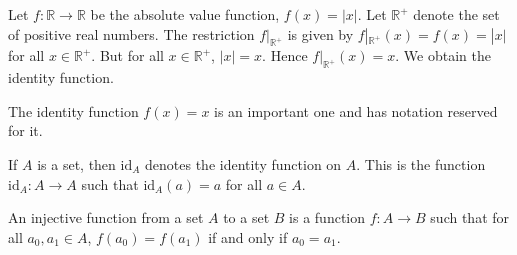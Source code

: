             \begin{example}
                Let $f:\mathbb{R}\rightarrow\mathbb{R}$ be the absolute value
                function, $f(x)=|x|$. Let $\mathbb{R}^{+}$ denote the set of
                positive real numbers. The restriction
                $f|_{\mathbb{R}^{+}}$ is given by
                $f|_{\mathbb{R}^{+}}(x)=f(x)=|x|$ for all $x\in\mathbb{R}^{+}$.
                But for all $x\in\mathbb{R}^{+}$, $|x|=x$. Hence
                $f|_{\mathbb{R}^{+}}(x)=x$. We obtain the identity function.
            \end{example}
            The identity function $f(x)=x$ is an important one and has notation
            reserved for it.
            \begin{notation}
                If $A$ is a set, then $\textrm{id}_{A}$ denotes the identity
                function on $A$. This is the function
                $\textrm{id}_{A}:A\rightarrow{A}$ such that
                $\textrm{id}_{A}(a)=a$ for all $a\in{A}$.
            \end{notation}
            \begin{definition}
                An injective function from a set $A$ to a set $B$ is a function
                $f:A\rightarrow{B}$ such that for all $a_{0},a_{1}\in{A}$,
                $f(a_{0})=f(a_{1})$ if and only if $a_{0}=a_{1}$.
            \end{definition}
